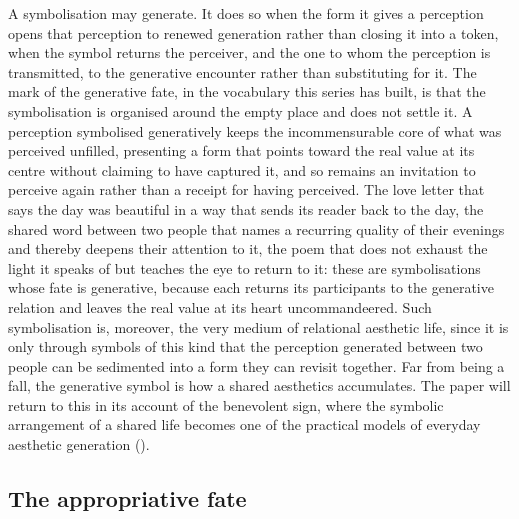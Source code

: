 A symbolisation may generate. It does so when the form it gives a perception opens that perception to renewed generation rather than closing it into a token, when the symbol returns the perceiver, and the one to whom the perception is transmitted, to the generative encounter rather than substituting for it. The mark of the generative fate, in the vocabulary this series has built, is that the symbolisation is organised around the empty place and does not settle it. A perception symbolised generatively keeps the incommensurable core of what was perceived unfilled, presenting a form that points toward the real value at its centre without claiming to have captured it, and so remains an invitation to perceive again rather than a receipt for having perceived. The love letter that says the day was beautiful in a way that sends its reader back to the day, the shared word between two people that names a recurring quality of their evenings and thereby deepens their attention to it, the poem that does not exhaust the light it speaks of but teaches the eye to return to it: these are symbolisations whose fate is generative, because each returns its participants to the generative relation and leaves the real value at its heart uncommandeered. Such symbolisation is, moreover, the very medium of relational aesthetic life, since it is only through symbols of this kind that the perception generated between two people can be sedimented into a form they can revisit together. Far from being a fall, the generative symbol is how a shared aesthetics accumulates. The paper will return to this in its account of the benevolent sign, where the symbolic arrangement of a shared life becomes one of the practical models of everyday aesthetic generation ().

\subsection{The appropriative fate}
\label{p23:sub:sym-appropriative}

